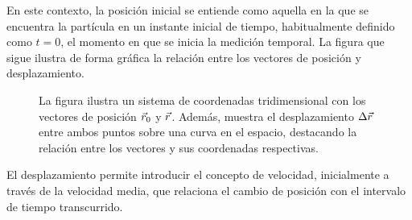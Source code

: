 En este contexto, la posición inicial se entiende como aquella en la que se encuentra la partícula en un instante inicial de tiempo, habitualmente definido como $t=0$, el momento en que se inicia la medición temporal. La figura que sigue ilustra de forma gráfica la relación entre los vectores de posición y desplazamiento.

\begin{figure}
    \centering
    \caption{La figura ilustra un sistema de coordenadas tridimensional con los vectores de posición $\vec{r}_0$ y $\vec{r}$. Además, muestra el desplazamiento $\Delta\vec{r}$ entre ambos puntos sobre una curva en el espacio, destacando la relación entre los vectores y sus coordenadas respectivas.}
    \label{fig:desplazamiento}
\end{figure}

El desplazamiento permite introducir el concepto de velocidad, inicialmente a través de la velocidad media, que relaciona el cambio de posición con el intervalo de tiempo transcurrido.

